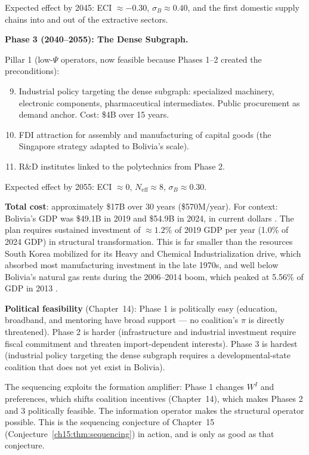 \documentclass[../structural_economics_book.tex]{subfiles}
\begin{document}
\begin{example}
Expected effect by 2045: ECI $\approx -0.30$, $\sigma_B \approx 0.40$, and the first domestic supply chains into and out of the extractive sectors.

\textbf{Phase 3 (2040--2055): The Dense Subgraph.}

Pillar 1 (low-$\Psi$ operators, now feasible because Phases 1--2 created the preconditions):
\begin{enumerate}
\setcounter{enumi}{8}
\item Industrial policy targeting the dense subgraph: specialized machinery, electronic components, pharmaceutical intermediates. Public procurement as demand anchor. Cost: \$4B over 15 years.
\item FDI attraction for assembly and manufacturing of capital goods (the Singapore strategy adapted to Bolivia's scale).
\item R\&D institutes linked to the polytechnics from Phase 2.
\end{enumerate}

Expected effect by 2055: ECI $\approx 0$, $N_{\text{eff}} \approx 8$, $\sigma_B \approx 0.30$.

\textbf{Total cost}: approximately \$17B over 30 years (\$570M/year). For context: Bolivia's GDP was \$49.1B in 2019 and \$54.9B in 2024, in current dollars \citep{worldbank2026wdi}. The plan requires sustained investment of $\approx 1.2\%$ of 2019 GDP per year (1.0\% of 2024 GDP) in structural transformation. This is far smaller than the resources South Korea mobilized for its Heavy and Chemical Industrialization drive, which absorbed most manufacturing investment in the late 1970s, and well below Bolivia's natural gas rents during the 2006--2014 boom, which peaked at 5.56\% of GDP in 2013 \citep{worldbank2026wdi}.

\textbf{Political feasibility} (Chapter~14): Phase 1 is politically easy (education, broadband, and mentoring have broad support --- no coalition's $\pi$ is directly threatened). Phase 2 is harder (infrastructure and industrial investment require fiscal commitment and threaten import-dependent interests). Phase 3 is hardest (industrial policy targeting the dense subgraph requires a developmental-state coalition that does not yet exist in Bolivia).

The sequencing exploits the formation amplifier: Phase 1 changes $W^I$ and preferences, which shifts coalition incentives (Chapter~14), which makes Phases 2 and 3 politically feasible. The information operator makes the structural operator possible. This is the sequencing conjecture of Chapter~15 (Conjecture~\ref{ch15:thm:sequencing}) in action, and is only as good as that conjecture.
\end{example}
\end{document}
